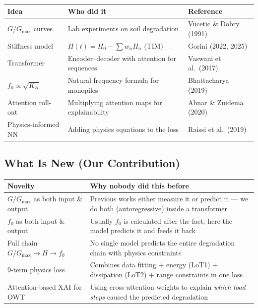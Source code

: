 \documentclass[11pt,a4paper]{article}
\begin{document}
\begin{center}
\small
\begin{tabularx}{\textwidth}{lXl}
\toprule
\textbf{Idea} & \textbf{Who did it} & \textbf{Reference} \\
\midrule
$G/G_{\max}$ curves & Lab experiments on soil degradation &
  Vucetic \& Dobry (1991) \\
Stiffness model & $H(t) = H_0 - \sum w_n H_n$ (TIM) &
  Gorini (2022, 2025) \\
Transformer & Encoder--decoder with attention for sequences &
  Vaswani et al.\ (2017) \\
$f_0 \propto \sqrt{K_R}$ & Natural frequency formula for monopiles &
  Bhattacharya (2019) \\
Attention roll-out & Multiplying attention maps for explainability &
  Abnar \& Zuidema (2020) \\
Physics-informed NN & Adding physics equations to the loss &
  Raissi et al.\ (2019) \\
\bottomrule
\end{tabularx}
\end{center}

\subsection{What Is New (Our Contribution)}

\begin{center}
\small
\begin{tabularx}{\textwidth}{lX}
\toprule
\textbf{Novelty} & \textbf{Why nobody did this before} \\
\midrule
$G/G_{\max}$ as both input \& output &
  Previous works either measure it or predict it --- we do both
  (autoregressive) inside a transformer \\
$f_0$ as both input \& output &
  Usually $f_0$ is calculated after the fact; here the model
  predicts it and feeds it back \\
Full chain $G/G_{\max} \to H \to f_0$ &
  No single model predicts the entire degradation chain with
  physics constraints \\
9-term physics loss &
  Combines data fitting + energy (LoT1) + dissipation (LoT2) +
  range constraints in one loss \\
Attention-based XAI for OWT &
  Using cross-attention weights to explain \emph{which load steps}
  caused the predicted degradation \\
\bottomrule
\end{tabularx}
\end{center}
\end{document}
